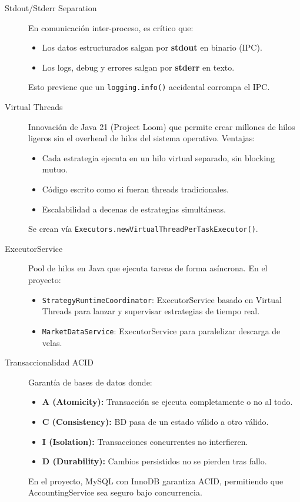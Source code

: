 \begin{description}
    \item[Stdout/Stderr Separation] En comunicación inter-proceso, es crítico que:
    \begin{itemize}
        \item Los datos estructurados salgan por \textbf{stdout} en binario (IPC).
        \item Los logs, debug y errores salgan por \textbf{stderr} en texto.
    \end{itemize}
    Esto previene que un \texttt{logging.info()} accidental corrompa el IPC.

    \item[Virtual Threads] Innovación de Java 21 (Project Loom) que permite crear millones de hilos ligeros sin el overhead de hilos del sistema operativo. Ventajas:
    \begin{itemize}
        \item Cada estrategia ejecuta en un hilo virtual separado, sin blocking mutuo.
        \item Código escrito como si fueran threads tradicionales.
        \item Escalabilidad a decenas de estrategias simultáneas.
    \end{itemize}
    Se crean vía \texttt{Executors.newVirtualThreadPerTaskExecutor()}.

    \item[ExecutorService] Pool de hilos en Java que ejecuta tareas de forma asíncrona. En el proyecto:
    \begin{itemize}
        \item \texttt{StrategyRuntimeCoordinator}: ExecutorService basado en Virtual Threads para lanzar y supervisar estrategias de tiempo real.
        \item \texttt{MarketDataService}: ExecutorService para paralelizar descarga de velas.
    \end{itemize}

    \item[Transaccionalidad ACID] Garantía de bases de datos donde:
    \begin{itemize}
        \item \textbf{A (Atomicity):} Transacción se ejecuta completamente o no al todo.
        \item \textbf{C (Consistency):} BD pasa de un estado válido a otro válido.
        \item \textbf{I (Isolation):} Transacciones concurrentes no interfieren.
        \item \textbf{D (Durability):} Cambios persistidos no se pierden tras fallo.
    \end{itemize}
    En el proyecto, MySQL con InnoDB garantiza ACID, permitiendo que AccountingService sea seguro bajo concurrencia.


\end{description}
